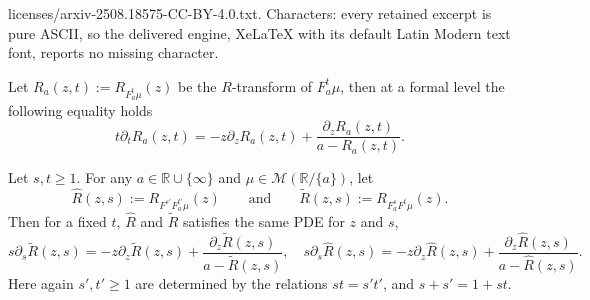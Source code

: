 \documentclass[10pt,a4paper]{amsart}
\newcommand{\MM}{\mathcal{M}}
\newcommand{\pfreepower}[2]{F_{#1}^{#2}}
\newcommand{\rr}{\mathbb{R}}
\begin{document}
licenses/arxiv-2508.18575-CC-BY-4.0.txt. Characters: every retained excerpt is pure ASCII, so the delivered engine, XeLaTeX with its default Latin Modern text font, reports no missing character.
\begin{proposition}\label{prop:PDEforR}
     Let $ R_a(z,t):=R_{\pfreepower{a}{t}\mu}(z) $ be the $R$-transform of $ \pfreepower{a}{t}\mu $, then at a formal level the following equality holds
     $$  t\partial_t R_a(z,t) = -z\partial_z R_a(z,t) +\frac{ \partial_z R_a(z,t) }{ a-R_a(z,t) }.$$
\end{proposition}

\begin{proposition}
    Let $s,t\geq 1$. For any $a\in \rr\cup\{\infty\} $ and $ \mu \in \MM(\rr/\{a\}) $, let $$ \hat{R}(z,s):= R_{ F^{s'}F_a^{t'}\mu }(z) \qquad \text{and} \qquad \tilde{R}(z,s):= R_{ \pfreepower{a}{s} F^t\mu }(z) .$$ Then for a fixed $t$, $ \hat{R} $ and $\tilde{R}$ satisfies the same PDE for $z$ and $s$,
    $$ s\partial_s \tilde{R}(z,s) = -z\partial_z \tilde{R}(z,s) +\frac{ \partial_z \tilde{R}(z,s) }{ a-\tilde{R}(z,s) },\quad s\partial_s \hat{R}(z,s) = -z\partial_z \hat{R}(z,s) +\frac{ \partial_z \hat{R}(z,s) }{ a-\hat{R}(z,s) }. $$
    Here again $s',t'\geq 1$ are determined by the relations $ st=s't'$, and $ s+s'=1+st $.
\end{proposition}
\end{document}

